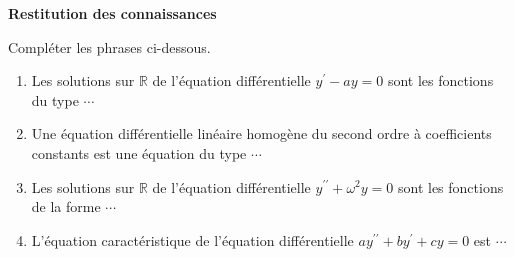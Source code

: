 



 \summary{}
 
	


 \textbf {Restitution des connaissances}
 
  \begin{exercice} 
  Compléter les phrases ci-dessous.
  \begin{enumerate}
  \item  Les solutions sur $ \mathbb{R} $ de l'équation différentielle  $y^{\prime}- a y = 0$ sont les fonctions  du type $ \cdots $
  \item Une équation différentielle linéaire homogène du second   ordre à coefficients constants est une équation
du type $\cdots$
\item Les solutions sur $ \mathbb{R} $ de l'équation différentielle  $y^{\prime\prime}+\omega^2 y = 0$ sont les fonctions de la forme  $ \cdots $
\item L'équation caractéristique de l'équation différentielle $ay^{\prime\prime}+by^{\prime}+c y = 0$ est $ \cdots $
  \end{enumerate}
\end{exercice}
